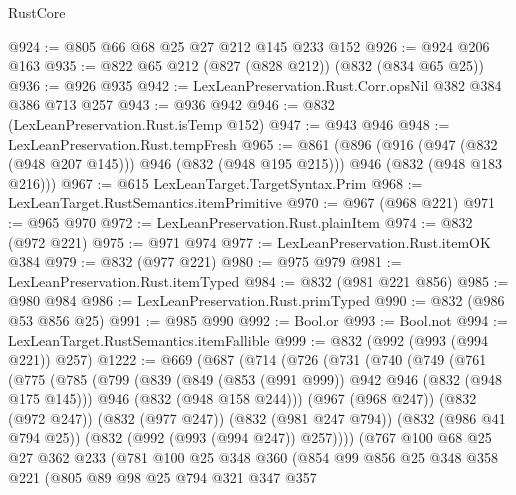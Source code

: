 \begin{lexlean}{RustCore}
\begin{coremodule}
@924 := @805 @66 @68 @25 @27 @212 @145 @233 @152
@926 := @924 @206 @163
@935 := @822 @65 @212 (@827 (@828 @212)) (@832 (@834 @65 @25))
@936 := @926 @935
@942 := LexLeanPreservation.Rust.Corr.opsNil @382 @384 @386 @713 @257
@943 := @936 @942
@946 := @832 (LexLeanPreservation.Rust.isTemp @152)
@947 := @943 @946
@948 := LexLeanPreservation.Rust.tempFresh
@965 := @861
    (@896
      (@916 (@947 (@832 (@948 @207 @145))) @946 (@832 (@948 @195 @215)))
      @946
      (@832 (@948 @183 @216)))
@967 := @615 LexLeanTarget.TargetSyntax.Prim
@968 := LexLeanTarget.RustSemantics.itemPrimitive
@970 := @967 (@968 @221)
@971 := @965 @970
@972 := LexLeanPreservation.Rust.plainItem
@974 := @832 (@972 @221)
@975 := @971 @974
@977 := LexLeanPreservation.Rust.itemOK @384
@979 := @832 (@977 @221)
@980 := @975 @979
@981 := LexLeanPreservation.Rust.itemTyped
@984 := @832 (@981 @221 @856)
@985 := @980 @984
@986 := LexLeanPreservation.Rust.primTyped
@990 := @832 (@986 @53 @856 @25)
@991 := @985 @990
@992 := Bool.or
@993 := Bool.not
@994 := LexLeanTarget.RustSemantics.itemFallible
@999 := @832 (@992 (@993 (@994 @221)) @257)
@1222 := @669
    (@687
      (@714
        (@726
          (@731
            (@740
              (@749
                (@761
                  (@775
                    (@785
                      (@799
                        (@839
                          (@849 (@853 (@991 @999)) @942 @946 (@832 (@948 @175 @145)))
                          @946
                          (@832 (@948 @158 @244)))
                        (@967 (@968 @247))
                        (@832 (@972 @247))
                        (@832 (@977 @247))
                        (@832 (@981 @247 @794))
                        (@832 (@986 @41 @794 @25))
                        (@832 (@992 (@993 (@994 @247)) @257))))
                    (@767
                      @100
                      @68
                      @25
                      @27
                      @362
                      @233
                      (@781
                        @100
                        @25
                        @348
                        @360
                        (@854
                          @99
                          @856
                          @25
                          @348
                          @358
                          @221
                          (@805
                            @89
                            @98
                            @25
                            @794
                            @321
                            @347
                            @357

\end{coremodule}
\end{lexlean}
